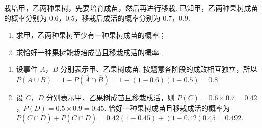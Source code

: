 \begin{problem}
栽培甲，乙两种果树，先要培育成苗，然后再进行移栽. 已知甲，乙两种果树成苗的概率分别为 \(0.6\)，\(0.5\)，移栽后成活的概率分别为 \(0.7\)，\(0.9\).

\begin{enumerate}
\item 求甲，乙两种果树至少有一种果树成苗的概率；
\item 求恰好一种果树能栽培成苗且移栽成活的概率.
\end{enumerate}

\begin{solution}
\begin{enumerate}
\item 设事件 \(A\)，\(B\) 分别表示甲、乙果树成苗. 按题意各阶段的成败相互独立，所以 \(P(A\cup B)=1-P(\overline{A}\cap\overline{B})=1-(1-0.6)(1-0.5)=0.8\).
\item 设 \(C\)，\(D\) 分别表示甲、乙果树成苗且移栽成活，则 \(P(C)=0.6\times0.7=0.42\)，\(P(D)=0.5\times0.9=0.45\). 恰好一种果树成苗且移栽成活的概率为 \(P(C\cap\overline{D})+P(\overline{C}\cap D)=0.42(1-0.45)+(1-0.42)0.45=0.492\).
\end{enumerate}
\end{solution}
\end{problem}

